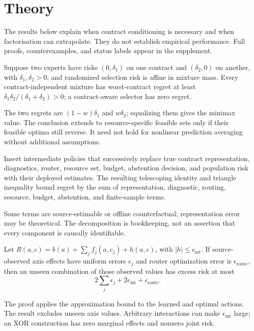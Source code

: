 \section{Theory}

The results below explain when contract conditioning is necessary and when factorisation can extrapolate. They do not establish empirical performance. Full proofs, counterexamples, and status labels appear in the supplement.

\begin{theorem}
Suppose two experts have risks \((0,\delta_1)\) on one contract and \((\delta_2,0)\) on another, with \(\delta_1,\delta_2>0\), and randomized selection risk is affine in mixture mass. Every contract-independent mixture has worst-contract regret at least \(\delta_1\delta_2/(\delta_1+\delta_2)>0\); a contract-aware selector has zero regret.
\end{theorem}
The two regrets are \((1-w)\delta_1\) and \(w\delta_2\); equalizing them gives the minimax value. The conclusion extends to resource-specific feasible sets only if their feasible optima still reverse. It need not hold for nonlinear prediction averaging without additional assumptions.

\begin{proposition}
Insert intermediate policies that successively replace true contract representation, diagnostics, router, resource set, budget, abstention decision, and population risk with their deployed estimates. The resulting telescoping identity and triangle inequality bound regret by the sum of representation, diagnostic, routing, resource, budget, abstention, and finite-sample terms.
\end{proposition}
Some terms are source-estimable or offline counterfactual; representation error may be theoretical. The decomposition is bookkeeping, not an assertion that every component is causally identifiable.

\begin{theorem}
Let \(R(a,c)=b(a)+\sum_jf_j(a,c_j)+h(a,c)\), with \(|h|\leq\epsilon_{\mathrm{int}}\). If source-observed axis effects have uniform errors \(\epsilon_j\) and router optimization error is \(\epsilon_{\mathrm{route}}\), then an unseen combination of those observed values has excess risk at most
\[
2\sum_j\epsilon_j+2\epsilon_{\mathrm{int}}+\epsilon_{\mathrm{route}}.
\]
\end{theorem}
The proof applies the approximation bound to the learned and optimal actions. The result excludes unseen axis values. Arbitrary interactions can make \(\epsilon_{\mathrm{int}}\) large; an XOR construction has zero marginal effects and nonzero joint risk.


